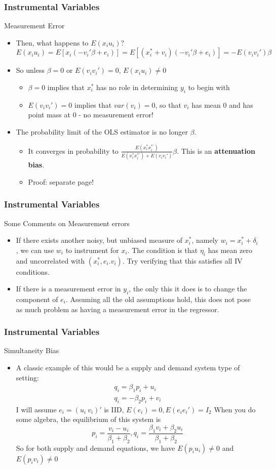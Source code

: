 \documentclass{beamer}
\begin{document}
\begin{frame}
\frametitle{Instrumental Variables}
Measurement Error
\begin{itemize}
\item Then, what happens to $E(x_iu_i)?$
\[
E(x_iu_i)=E[x_i(-v_i'\beta+e_i)]=E[(x_i^{*}+v_i)(-v_i'\beta+e_i)]=-E(v_iv_i')\beta
\]
\item So unless $\beta=0$ or $E(v_iv_i')=0$, $E(x_iu_i)\neq0$
\begin{itemize}
\item $\beta=0$ implies that $x_i^*$ has no role in determining $y_i$ to begin with
\item $E(v_iv_i')=0$ implies that $var(v_i)=0$, so that $v_i$ has mean 0 and has point mass at 0 - no measurement error!
\end{itemize}
\item The probability limit of the OLS estimator is no longer $\beta$.  
\begin{itemize}
\item It converges in probability to $\frac{E(x_i^*x_i^{*'})}{E(x_i^*x_i^{*'})+E(v_iv_i')}\beta $. This is an \textbf{attenuation bias}.
\item Proof: separate page!
\end{itemize}
\end{itemize}
\end{frame}

\begin{frame}
\frametitle{Instrumental Variables}
Some Comments on Measurement errors
\begin{itemize}
\item If there exists another noisy, but unbiased measure of $x_i^*$, namely $w_i=x_i^*+\delta_i$, we can use $w_i$ to instrument for $x_i$. The condition is that $\eta_i$ has mean zero and uncorrelated with $(x_i^*, e_i. v_i)$. Try verifying that this satisfies all IV conditions. 
\item If there is a measurement error in $y_i$, the only this it does is to change the component of $e_i$. Assuming all the old assumptions hold, this does not pose as much problem as having a measurement error in the regressor. 
\end{itemize}
\end{frame}

\begin{frame}
\frametitle{Instrumental Variables}
Simultaneity Bias
\begin{itemize}
\item A classic example of this would be a supply and demand system type of setting:
\begin{gather*}
q_i = \beta_1p_i+u_i \tag{Supply}\\
q_i = -\beta_2p_i+v_i \tag{Demand}
\end{gather*}
I will assume $e_i = (u_i \ v_i)'$ is IID, $E(e_i)=0, E(e_ie_i')=I_{2}$
When you do some algebra, the equilibrium of this system is 
\[
p_i = \frac{v_i-u_i}{\beta_1+\beta_2}, q_i = \frac{\beta_1v_i + \beta_2u_i}{\beta_1+\beta_2}
\]
So for both supply and demand equations, we have $E(p_iu_i)\neq0$ and $E(p_iv_i)\neq0$
\end{itemize}
\end{frame}
\end{document}
